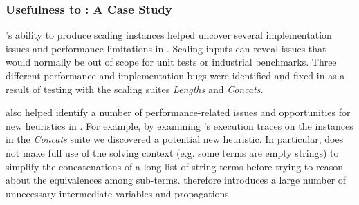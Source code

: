 \subsubsection{Usefulness to \us{}: A Case Study}
\fuzzer{}'s ability to produce scaling instances helped uncover several
implementation issues and performance limitations in \us{}. Scaling inputs
can reveal issues that would normally be out of scope for unit tests or
industrial benchmarks. Three different
performance and implementation bugs were identified and fixed in \us{}
as a result of testing with the \fuzzer{} scaling suites
\textit{Lengths} and \textit{Concats}.

\fuzzer also helped identify a number of performance-related issues and opportunities for
new heuristics in \us{}. For example, by examining \us{}'s execution traces on the
instances in the \textit{Concats} suite we discovered a
potential new heuristic. In particular, \us{} does not
make full use of the solving context (e.g. some terms are empty
strings) to simplify the concatenations of a long list of string terms
before trying to reason about the equivalences among sub-terms. \us{}
therefore introduces a large number of unnecessary intermediate
variables and propagations.
